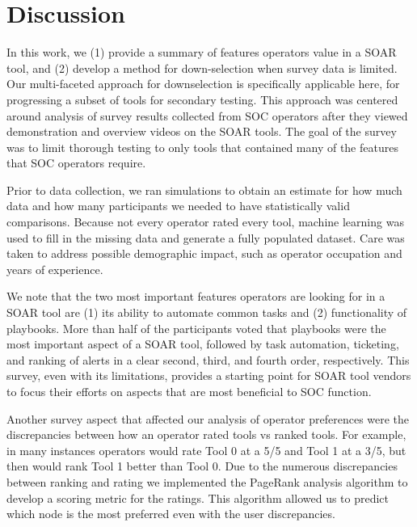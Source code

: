 \section{Discussion}
\vspace{-4mm}
In this work, we (1) provide a summary of features operators value in a SOAR tool, and (2) develop a method for down-selection when survey data is limited. Our multi-faceted approach for downselection is specifically applicable here, for progressing a subset of tools for secondary testing. This approach was centered around analysis of survey results collected from SOC operators after they viewed demonstration and overview videos on the SOAR tools. The goal of the survey was to limit thorough testing to only tools that contained many of the features that SOC operators require. 

Prior to data collection, we ran simulations to obtain an estimate for how much data and how many participants we needed to have statistically valid comparisons. Because not every operator rated every tool, machine learning was used to fill in the missing data and generate a fully populated dataset. Care was taken to address possible demographic impact, such as operator occupation and years of experience. 

We note that the two most important features operators are looking for in a SOAR tool are (1) its ability to automate common tasks and (2) functionality of playbooks. More than half of the participants voted that playbooks were the most important aspect of a SOAR tool, followed by task automation, ticketing, and ranking of alerts in a clear second, third, and fourth order, respectively. This survey, even with its limitations, provides a starting point for SOAR tool vendors to focus their efforts on aspects that are most beneficial to SOC function.

Another survey aspect that affected our analysis of operator preferences were the discrepancies between how an operator rated tools vs ranked tools. For example, in many instances operators would rate Tool 0 at a 5/5 and Tool 1 at a 3/5, but then would rank Tool 1 better than Tool 0. Due to the numerous discrepancies between ranking and rating we implemented the PageRank analysis algorithm to develop a scoring metric for the ratings. This algorithm allowed us to predict which node is the most preferred even with the user discrepancies.

